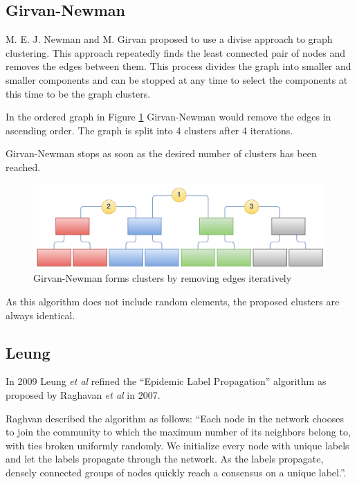 \subsection{Girvan-Newman}

M. E. J. Newman and M. Girvan\cite{girvan} proposed to use a divise approach to graph clustering. This approach repeatedly finds the least connected pair of nodes and removes the edges between them. This process divides the graph into smaller and smaller components and can be stopped at any time to select the components at this time to be the graph clusters.

In the ordered graph in Figure \ref{fig:girvan-newman-process} Girvan-Newman would remove the edges in ascending order. The graph is split into 4 clusters after 4 iterations.

Girvan-Newman stops as soon as the desired number of clusters has been reached.

\begin{figure}[H]
	\begin{center}
		\includegraphics[scale=0.45]{diagrams/Girvan-Newman-Process.pdf}
	\end{center}
	\caption{Girvan-Newman forms clusters by removing edges iteratively}
	\label{fig:girvan-newman-process}
\end{figure}

As this algorithm does not include random elements, the proposed clusters are always identical.

\subsection{Leung}

In 2009 Leung \textit{et al}\cite{leung} refined the \enquote{Epidemic Label Propagation} algorithm as proposed by Raghavan \textit{et al}\cite{raghavan} in 2007. 

Raghvan described the algorithm as follows: \enquote{Each node in the network chooses to
join the community to which the maximum number of its neighbors belong to, with ties broken uniformly randomly. We initialize every node with unique labels and let the labels propagate through the network. As the labels propagate, densely connected groups of nodes quickly reach a consensus on a unique label.}\cite[p. 4]{raghavan}.

